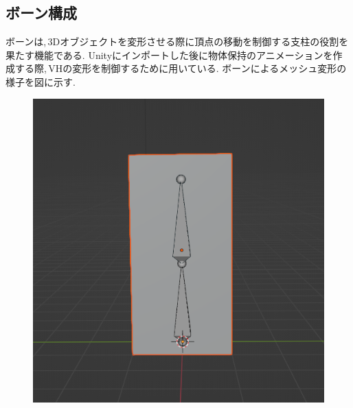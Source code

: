 \documentclass{ltjsreport}
\begin{document}
		\subsection{ボーン構成}
			ボーンは,\,3Dオブジェクトを変形させる際に頂点の移動を制御する支柱の役割を果たす機能である.
			Unityにインポートした後に物体保持のアニメーションを作成する際,\,VHの変形を制御するために用いている.
			ボーンによるメッシュ変形の様子を図に示す.
			\begin{figure}[H]
			\centering
			\begin{minipage}{0.25\columnwidth}
			\centering
			\includegraphics[width = \columnwidth]{../figs/bone1.png}
			\end{minipage}
			\hspace{0.04\columnwidth}
			\begin{minipage}{0.25\columnwidth}
			\centering

\end{minipage}
\end{figure}
\end{document}
